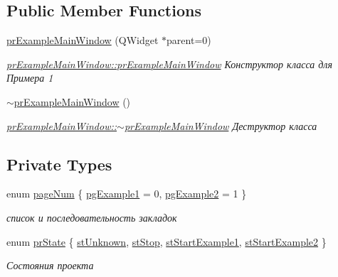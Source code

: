 \subsection*{Public Member Functions}
\begin{DoxyCompactItemize}
\item 
\hyperlink{classpr_example_main_window_a7324b8ba9b5bc40a8895ac8971bc0192}{pr\+Example\+Main\+Window} (Q\+Widget $\ast$parent=0)
\begin{DoxyCompactList}\small\item\em \hyperlink{classpr_example_main_window_a7324b8ba9b5bc40a8895ac8971bc0192}{pr\+Example\+Main\+Window\+::pr\+Example\+Main\+Window} Конструктор класса для Примера 1 \end{DoxyCompactList}\item 
\hyperlink{classpr_example_main_window_a0f04c65433b6de05dba55b26fb9fadba}{$\sim$pr\+Example\+Main\+Window} ()
\begin{DoxyCompactList}\small\item\em \hyperlink{classpr_example_main_window_a0f04c65433b6de05dba55b26fb9fadba}{pr\+Example\+Main\+Window\+::$\sim$pr\+Example\+Main\+Window} Деструктор класса \end{DoxyCompactList}\end{DoxyCompactItemize}
\subsection*{Private Types}
\begin{DoxyCompactItemize}
\item 
enum \hyperlink{classpr_example_main_window_aeaa415451eb7f9e8fa9d2966cc5c1991}{page\+Num} \{ \hyperlink{classpr_example_main_window_aeaa415451eb7f9e8fa9d2966cc5c1991a8ccb8e01eb3c2201be1e9d5f5771207d}{pg\+Example1} = 0, 
\hyperlink{classpr_example_main_window_aeaa415451eb7f9e8fa9d2966cc5c1991adc0a16291dd63c5e9f21f1def1e33fa1}{pg\+Example2} = 1
 \}\begin{DoxyCompactList}\small\item\em список и последовательность закладок \end{DoxyCompactList}
\item 
enum \hyperlink{classpr_example_main_window_ac6ea07691b05604b1dda8ec6263c028c}{pr\+State} \{ \hyperlink{classpr_example_main_window_ac6ea07691b05604b1dda8ec6263c028ca2d9733465da996ba5c35c393c9d2880e}{st\+Unknown}, 
\hyperlink{classpr_example_main_window_ac6ea07691b05604b1dda8ec6263c028caae61ac2ae5065b3aae1405ae3510c9ba}{st\+Stop}, 
\hyperlink{classpr_example_main_window_ac6ea07691b05604b1dda8ec6263c028ca5d5d6bf62aaa2f12854361685bbb54e7}{st\+Start\+Example1}, 
\hyperlink{classpr_example_main_window_ac6ea07691b05604b1dda8ec6263c028ca3d0c63cd76e8bec38a1ae7257b4df289}{st\+Start\+Example2}
 \}\begin{DoxyCompactList}\small\item\em Состояния проекта \end{DoxyCompactList}
\end{DoxyCompactItemize}

